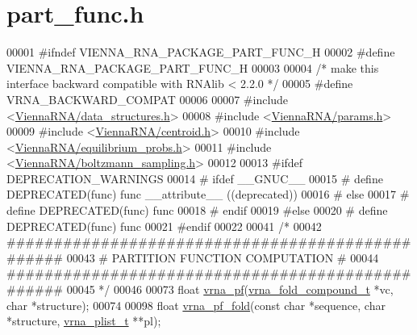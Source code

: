\hypertarget{part__func_8h_source}{}\section{part\+\_\+func.\+h}
\label{part__func_8h_source}

\begin{DoxyCode}
00001 \textcolor{preprocessor}{#ifndef VIENNA\_RNA\_PACKAGE\_PART\_FUNC\_H}
00002 \textcolor{preprocessor}{#define VIENNA\_RNA\_PACKAGE\_PART\_FUNC\_H}
00003 
00004 \textcolor{comment}{/* make this interface backward compatible with RNAlib < 2.2.0 */}
00005 \textcolor{preprocessor}{#define VRNA\_BACKWARD\_COMPAT}
00006 
00007 \textcolor{preprocessor}{#include <\hyperlink{data__structures_8h}{ViennaRNA/data\_structures.h}>}
00008 \textcolor{preprocessor}{#include <\hyperlink{params_8h}{ViennaRNA/params.h}>}
00009 \textcolor{preprocessor}{#include <\hyperlink{centroid_8h}{ViennaRNA/centroid.h}>}
00010 \textcolor{preprocessor}{#include <\hyperlink{equilibrium__probs_8h}{ViennaRNA/equilibrium\_probs.h}>}
00011 \textcolor{preprocessor}{#include <\hyperlink{boltzmann__sampling_8h}{ViennaRNA/boltzmann\_sampling.h}>}
00012 
00013 \textcolor{preprocessor}{#ifdef DEPRECATION\_WARNINGS}
00014 \textcolor{preprocessor}{# ifdef \_\_GNUC\_\_}
00015 \textcolor{preprocessor}{#  define DEPRECATED(func) func \_\_attribute\_\_ ((deprecated))}
00016 \textcolor{preprocessor}{# else}
00017 \textcolor{preprocessor}{#  define DEPRECATED(func) func}
00018 \textcolor{preprocessor}{# endif}
00019 \textcolor{preprocessor}{#else}
00020 \textcolor{preprocessor}{# define DEPRECATED(func) func}
00021 \textcolor{preprocessor}{#endif}
00022 
00041 \textcolor{comment}{/*}
00042 \textcolor{comment}{#################################################}
00043 \textcolor{comment}{# PARTITION FUNCTION COMPUTATION                #}
00044 \textcolor{comment}{#################################################}
00045 \textcolor{comment}{*/}
00046 
00073 \textcolor{keywordtype}{float} \hyperlink{group__pf__fold_ga29e256d688ad221b78d37f427e0e99bc}{vrna\_pf}(\hyperlink{group__fold__compound_structvrna__fc__s}{vrna\_fold\_compound\_t} *vc, \textcolor{keywordtype}{char} *structure);
00074 
00098 \textcolor{keywordtype}{float} \hyperlink{group__pf__fold_gafe8f523e16575e6e61bf8ff909663b5f}{vrna\_pf\_fold}(\textcolor{keyword}{const} \textcolor{keywordtype}{char} *sequence, \textcolor{keywordtype}{char} *structure, 
      \hyperlink{group__data__structures_structvrna__plist__s}{vrna\_plist\_t} **pl);

\end{DoxyCode}
